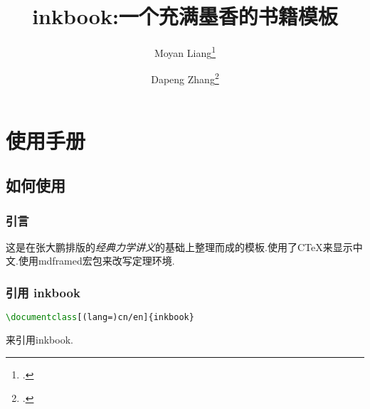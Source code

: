 \documentclass[en]{inkbook}
\title{\textsf{inkbook}:一个充满墨香的书籍模板}
\author{Moyan Liang\thanks{\aka{梁莫言}.} \and Dapeng Zhang\thanks{\aka{张大鹏}.}}
\begin{document}
    \maketitle
    \tableofcontents
    \part{使用手册}
    
    \chapter{如何使用}
    \section{引言}
    这是在张大鹏排版的\textit{经典力学讲义}的基础上整理而成的模板.使用了C\TeX{}来显示中文.使用\textsf{mdframed}宏包来改写定理环境.
    \section{引用 \textsf{inkbook}}
    \begin{lstlisting}[language=TeX]
        \documentclass[(lang=)cn/en]{inkbook}
    \end{lstlisting}
    来引用\textsf{inkbook}.
\end{document}
